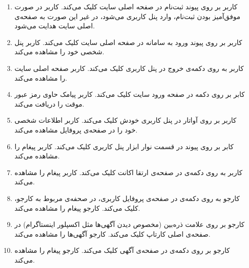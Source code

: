 \begin{enumerate}
	\item[]  			
	
	\tuc				
	{کاربر بر روی پیوند ثبت‌نام در صفحه اصلی سایت کلیک می‌کند.}				
	{کاربر در صورت موفق‌آمیز بودن ثبت‌نام، وارد پنل کاربری می‌شود، در غیر این صورت به صفحه‌ی اصلی سایت هدایت می‌شود.}
	
	\item[]  			
	\tuc				
	{کاربر بر روی پیوند ورود به سامانه در صفحه اصلی سایت کلیک می‌کند.}				
	{کاربر پنل شخصی خود را مشاهده می‌کند.}
	
	\item[] 
	\tuc				
	{کاربر به روی دکمه‌ی خروج در پنل کاربری کلیک می‌کند.}				
	{کاربر صفحه اصلی سایت را مشاهده می‌کند.}
	
	\item[] 
	\tuc				
	{کابر بر روی دکمه  در صفحه ورود سایت کلیک می‌کند.}				
	{کاربر پیامک حاوی رمز عبور موقت را دریافت می‌کند.}
	
	\item[] 
	\tuc				
	{کاربر بر روی آواتار در پنل کاربری خودش کلیک می‌کند.}				
	{کاربر اطلاعات شخصی خود را در صفحه‌ی پروفایل مشاهده می‌کند.}
	
	\item[] 
	\tuc				
	{کابر بر روی پیوند  در قسمت نوار ابزار پنل کاربری کلیک می‌کند.}	
	{کاربر پیغام  را مشاهده می‌کند.}
	
	\item[] 
	\tuc				
	{کاربر به روی دکمه‌ی  در صفحه‌ی ارتقا اکانت کلیک می‌کند.}
	{کاربر پیغام  را مشاهده می‌کند.}
	
	\item[] 
	\tuc				
	{کارجو به روی دکمه‌ی  در صفحه‌ی پروفایل کاربری، در صحفه‌ی مربوط به کارجو، کلیک می‌کند.}
	{کارجو پیغام  را مشاهده می‌کند.}
	
	\item[] 
	\tuc				
	{کارجو بر روی علامت ذره‌بین (مخصوص دیدن آگهی‌ها مثل اکسپلور اینستاگرام) در صفحه‌ی اصلی کارتاپ کلیک می‌کند.}
	{کارجو آگهی‌ها را مشاهده می‌کند.}
	
	\item[] 
	\tuc				
	{کارجو بر روی دکمه‌ی  در صفحه‌ی آگهی کلیک می‌کند.}				
	{کارجو پیغام  را مشاهده می‌کند.}
	

\end{enumerate}
